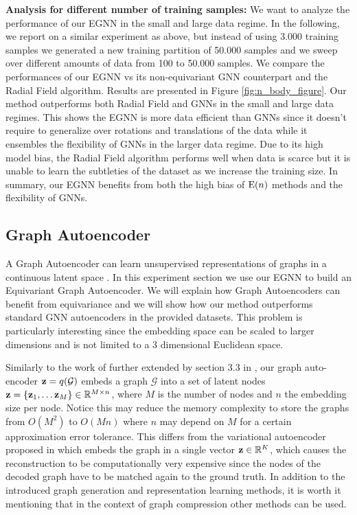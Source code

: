\textbf{Analysis for different number of training samples:} We want to analyze the performance of our EGNN in the small and large data regime. In the following, we report on a similar experiment as above, but instead of using 3.000 training samples we generated a new training partition of 50.000 samples and we sweep over different amounts of data from 100 to 50.000 samples. We compare the performances of our EGNN vs its non-equivariant GNN counterpart and the Radial Field algorithm. Results are presented in Figure \ref{fig:n_body_figure}. Our method outperforms both Radial Field and GNNs in the small and large data regimes. This shows the EGNN is more data efficient than GNNs since it doesn't require to generalize over rotations and translations of the data while it ensembles the flexibility of GNNs in the larger data regime. Due to its high model bias, the Radial Field algorithm performs well when data is scarce but it is unable to learn the subtleties of the dataset as we increase the training size. In summary, our EGNN benefits from both the high bias of $\mathrm{E}(n)$ methods and the flexibility of GNNs.


\subsection{Graph Autoencoder} \label{sec:expriment_autoencoder}



A Graph Autoencoder can learn unsupervised representations of graphs in a continuous latent space \cite{kipf2016variational, simonovsky2018graphvae}. In this experiment section we use our EGNN to build an Equivariant Graph Autoencoder. We will explain how Graph Autoencoders can benefit from equivariance and we will show how our method outperforms standard GNN autoencoders in the provided datasets. This problem is particularly interesting since the embedding space can be scaled to larger dimensions and is not limited to a 3 dimensional Euclidean space.

Similarly to the work of \cite{kipf2016variational} further extended by section 3.3 in \cite{liu2019graph}, our graph auto-encoder $\mathbf{z} = q(\mathcal{G})$ embeds a graph $\mathcal{G}$ into a set of latent nodes $\mathbf{z} = \{\mathbf{z}_1, \dots \mathbf{z}_M \} \in \mathbb{R}^{M \times n}$, where $M$ is the number of nodes and $n$ the embedding size per node. Notice this may reduce the memory complexity to store the graphs from $O(M^2)$ to $O(Mn)$ where $n$ may depend on $M$ for a certain approximation error tolerance. This differs from the variational autoencoder proposed in \cite{simonovsky2018graphvae} which embeds the graph in a single vector $\mathbf{z} \in \mathbb{R}^K$, which causes the reconstruction to be computationally very expensive since the nodes of the decoded graph have to be matched again to the ground truth. In addition to the introduced graph generation and representation learning methods, it is worth it mentioning that in the context of graph compression other methods \cite{candes2009exact} can be used.

